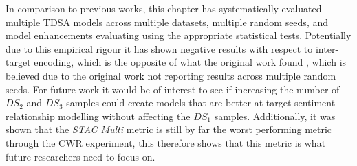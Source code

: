 In comparison to previous works, this chapter has systematically evaluated multiple TDSA models across multiple datasets, multiple random seeds, and model enhancements evaluating using the appropriate statistical tests. Potentially due to this empirical rigour it has shown negative results with respect to inter-target encoding, which is the opposite of what the original work found \citep{hazarika-etal-2018-modeling}, which is believed due to the original work not reporting results across multiple random seeds. For future work it would be of interest to see if increasing the number of $DS_2$ and $DS_3$ samples could create models that are better at target sentiment relationship modelling without affecting the $DS_1$ samples. Additionally, it was shown that the \textit{STAC Multi} metric is still by far the worst performing metric through the CWR experiment, this therefore shows that this metric is what future researchers need to focus on.   %





